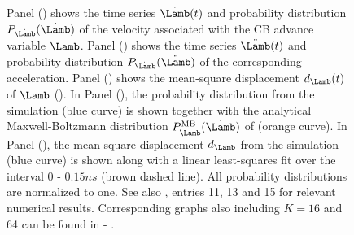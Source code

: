 \begin{figure}
    \centering
    \\[-1em]
    \\[-1em]
    \caption{\footnotesize
%
%
%
             Panel () shows the time series $\dot{\Lamb}(t)$ and probability distribution $P_{\dot{\Lamb}}(\dot{\Lamb})$
                       of the velocity associated with the CB advance variable $\Lamb$.
%
             Panel () shows the time series $\ddot{\Lamb}(t)$ and probability 
                       distribution $P_{\ddot{\Lamb}}(\ddot{\Lamb})$ of the corresponding acceleration.
             Panel () shows the mean-square displacement 
             $d_{\Lamb}(t)$ of $\Lamb$ ().
%
             In Panel (), the probability distribution from the simulation (blue curve) is shown 
together with the
             analytical Maxwell-Boltzmann distribution $P^{\mathrm{MB}}_{\dot{\Lamb}}(\dot{\Lamb})$ of  (orange curve).
             In Panel (), the mean-square displacement $d_{\Lamb}$ from the simulation (blue curve)
             is shown along with a linear least-squares fit over the interval 0 - $0.15\unit{ns}$ (brown dashed line).
            All probability distributions are normalized to one. 
%
          See also ,
            entries 11, 13 and 15 for relevant numerical results. 
            Corresponding graphs also including $K=16$ and 64 can be found in 
             - .
%
   }
\label{fig:dynamics}
\end{figure}

